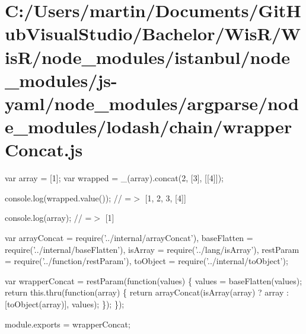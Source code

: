 \hypertarget{_c_1_2_users_2martin_2_documents_2_git_hub_visual_studio_2_bachelor_2_wis_r_2_wis_r_2node_module462be5b7170d04c472caf7d600739198}{}\section{C\+:/\+Users/martin/\+Documents/\+Git\+Hub\+Visual\+Studio/\+Bachelor/\+Wis\+R/\+Wis\+R/node\+\_\+modules/istanbul/node\+\_\+modules/js-\/yaml/node\+\_\+modules/argparse/node\+\_\+modules/lodash/chain/wrapper\+Concat.\+js}
var array = \mbox{[}1\mbox{]}; var wrapped = \+\_\+(array).concat(2, \mbox{[}3\mbox{]}, \mbox{[}\mbox{[}4\mbox{]}\mbox{]});

console.\+log(wrapped.\+value()); // =$>$ \mbox{[}1, 2, 3, \mbox{[}4\mbox{]}\mbox{]}

console.\+log(array); // =$>$ \mbox{[}1\mbox{]}


\begin{DoxyCodeInclude}
var arrayConcat = require(\textcolor{stringliteral}{'../internal/arrayConcat'}),
    baseFlatten = require(\textcolor{stringliteral}{'../internal/baseFlatten'}),
    isArray = require(\textcolor{stringliteral}{'../lang/isArray'}),
    restParam = require(\textcolor{stringliteral}{'../function/restParam'}),
    toObject = require(\textcolor{stringliteral}{'../internal/toObject'});

var wrapperConcat = restParam(\textcolor{keyword}{function}(values) \{
  values = baseFlatten(values);
  \textcolor{keywordflow}{return} this.thru(\textcolor{keyword}{function}(array) \{
    \textcolor{keywordflow}{return} arrayConcat(isArray(array) ? array : [toObject(array)], values);
  \});
\});

module.exports = wrapperConcat;
\end{DoxyCodeInclude}
 